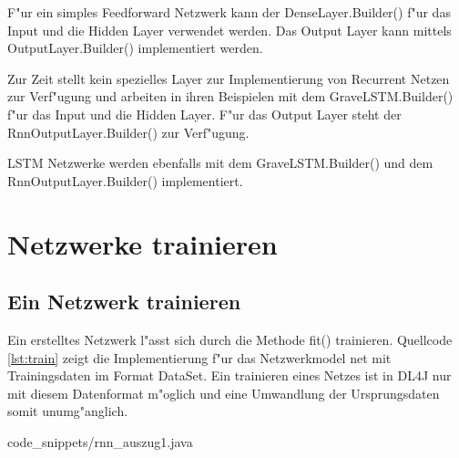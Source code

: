 {F"ur ein simples Feedforward Netzwerk kann der DenseLayer.Builder() f"ur das Input und die Hidden Layer verwendet werden. Das Output Layer kann mittels OutputLayer.Builder() implementiert werden.

Zur Zeit stellt \cite{DL4J} kein spezielles Layer zur Implementierung von Recurrent Netzen zur Verf"ugung und arbeiten in ihren Beispielen mit dem GraveLSTM.Builder() f"ur das Input und die Hidden Layer. F"ur das Output Layer steht der RnnOutputLayer.Builder() zur Verf"ugung.

LSTM Netzwerke werden ebenfalls mit dem GraveLSTM.Builder() und dem RnnOutputLayer.Builder() implementiert.


\section{Netzwerke trainieren}
\subsection{Ein Netzwerk trainieren}
Ein erstelltes Netzwerk l"asst sich durch die Methode fit() trainieren. Quellcode \ref{lst:train} zeigt die Implementierung f"ur das Netzwerkmodel net mit Trainingsdaten im Format DataSet. Ein trainieren eines Netzes ist in DL4J nur mit diesem Datenformat m"oglich und eine Umwandlung der Ursprungsdaten somit unumg"anglich.

{code_snippets/rnn_auszug1.java}

}

